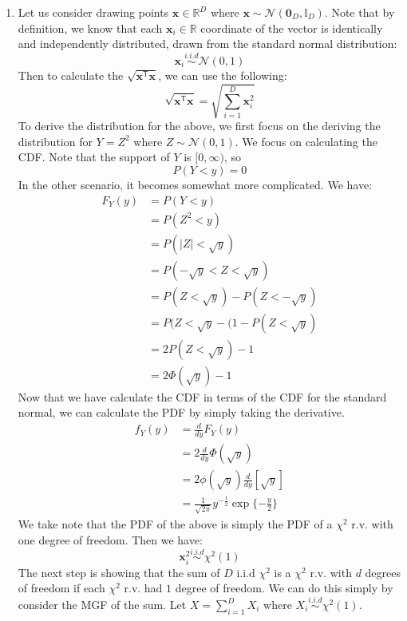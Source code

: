 \documentclass[submit]{harvardml}
\newcommand{\trans}{\mathsf{T}}
\newcommand{\bx}{\mathbf{x}}
\newcommand{\distNorm}{\mathcal{N}}
\newcommand{\bzero}{\mathbf{0}}
\newcommand{\ident}{\mathbb{I}}
\begin{document}
\begin{enumerate}
\item Let us consider drawing points $\bx \in \mathbb{R}^D$ where $\bx \sim \distNorm(\bzero_D, \ident_D)$. Note that by definition, we know that each $\bx_i \in \mathbb{R}$ coordinate of the vector is identically and independently distributed, drawn from the standard normal distribution:
$$
\bx_i \stackrel{i.i.d}{\sim} \distNorm(0,1)
$$
Then to calculate the $\sqrt{\bx^\trans\bx}$, we can use the following:
$$
\sqrt{\bx^\trans\bx} = \sqrt{\sum_{i=1}^D \bx_i^2}
$$
To derive the distribution for the above, we first focus on the deriving the distribution for $Y = Z^2$ where $Z \sim \distNorm(0,1)$. We focus on calculating the CDF. Note that the support of $Y$ is $[0,\infty)$, so
$$
P(Y < y) = 0
$$
In the other scenario, it becomes somewhat more complicated. We have:
\begin{align*}
F_Y(y) &= P( Y < y) \\
&= P(Z^2 < y) \\
&= P(|Z| < \sqrt{y}) \\
&= P(-\sqrt{y} < Z < \sqrt{y}) \\
&= P(Z < \sqrt{y}) - P(Z < -\sqrt{y}) \\
&= P(Z < \sqrt{y} - (1 - P(Z < \sqrt{y}) \tag{Symmetry of Normal} \\
&= 2P(Z < \sqrt{y}) - 1 \\
&= 2\Phi(\sqrt{y}) \tag{CDF of standard normal} - 1
\end{align*}
Now that we have calculate the CDF in terms of the CDF for the standard normal, we can calculate the PDF by simply taking the derivative.
\begin{align*}
f_Y(y) &= \frac{d}{dy}F_Y(y) \\
&= 2\frac{d}{dy} \Phi(\sqrt{y}) \tag{constants dropped} \\
&= 2\phi(\sqrt{y}) \frac{d}{dy} \left[\sqrt{y}\right] \\
&= \frac{1}{\sqrt{2\pi}}y^{-\frac{1}{2}}\exp \{-\frac{y}{2} \} \tag{definition of standard normal}
\end{align*}
We take note that the PDF of the above is simply the PDF of a $\chi^2$ r.v. with one degree of freedom. Then we have:
$$
\bx_i^2 \stackrel{i.i.d}{\sim} \chi^2(1)
$$
The next step is showing that the sum of $D$ i.i.d $\chi^2$ is a $\chi^2$ r.v. with $d$ degrees of freedom if each $\chi^2$ r.v. had $1$ degree of freedom. We can do this simply by consider the MGF of the sum. Let $X = \sum_{i=1}^D X_i$ where $X_i \stackrel{i.i.d}{\sim} \chi^2(1)$.

\end{enumerate}
\end{document}
